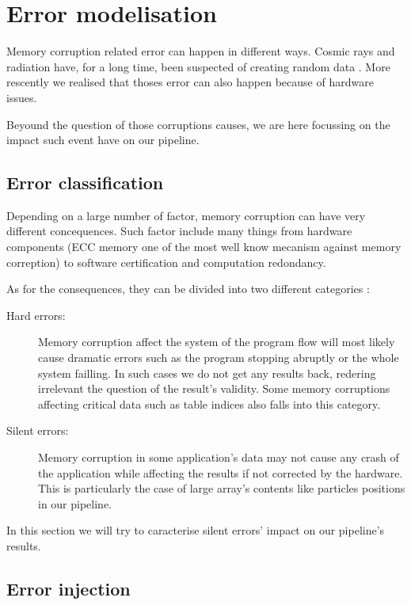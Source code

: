 \documentclass[10pt,a4paper,twoside,twocolumn]{article}
\begin{document}
\section{Error modelisation}

Memory corruption related error can happen in different ways. Cosmic rays and
radiation have, for a long time, been suspected of creating random data
. More rescently we realised that thoses error can also happen because
of hardware issues.

Beyound the question of those corruptions causes, we are here focussing on the
impact such event have on our pipeline.

\subsection{Error classification}

Depending on a large number of factor, memory corruption can have very different
concequences. Such factor include many things from hardware components (ECC
memory one of the most well know mecanism against memory correption) to software
certification and computation redondancy.

As for the consequences, they can be divided into two different categories :
\begin{description}
	\item[Hard errors:] Memory corruption affect the system of the program flow
		will most likely cause dramatic errors such as the program stopping
		abruptly or the whole system failling. In such cases we do not get any
		results back, redering irrelevant the question of the result's validity.
		Some memory corruptions affecting critical data such as table indices also
		falls into this category.

	\item[Silent errors:] Memory corruption in some application's data may not
		cause any crash of the application while affecting the results if not
		corrected by the hardware. This is particularly the case of large array's
		contents like particles positions in our pipeline.
\end{description}

In this section we will try to caracterise silent errors' impact on our
pipeline's results.

\subsection{Error injection}
\end{document}

